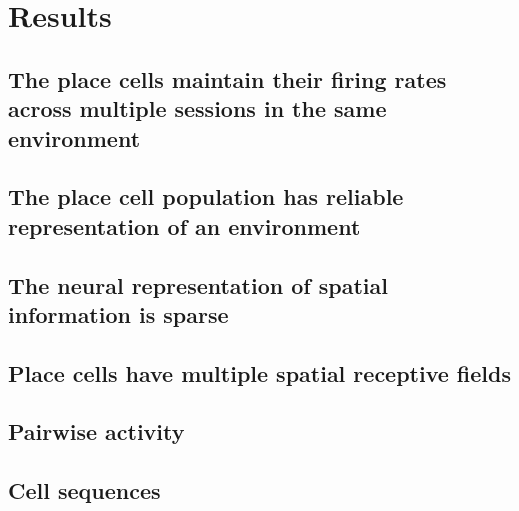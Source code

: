\chapter{Results}
\label{results}

\section{The place cells maintain their firing rates across multiple sessions in the same environment}

\section{The place cell population has reliable representation of an environment}

\section{The neural representation of spatial information is sparse}

\section{Place cells have multiple spatial receptive fields}

\section{Pairwise activity}

\section{Cell sequences}

\section{}


